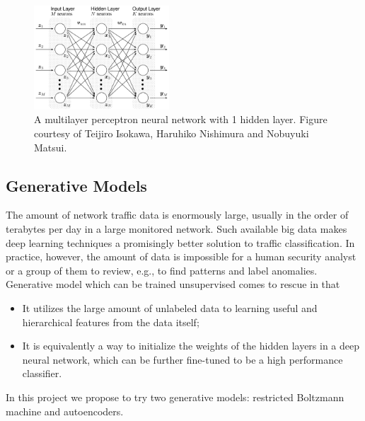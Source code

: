\begin{figure}[h]
    \centering
    \includegraphics[width=0.45\textwidth]{figures/multilayer_perceptron.png}
    \caption{A multilayer perceptron neural network with 1 hidden layer.
        Figure courtesy of Teijiro Isokawa, Haruhiko Nishimura and Nobuyuki Matsui.}
    \label{Fig:MLPArchitecture}
\end{figure}

\subsection{Generative Models}
The amount of network traffic data is enormously large, usually in the order of terabytes
per day in a large monitored network.
Such available big data makes deep learning techniques a promisingly better solution
to traffic classification.
In practice, however, the amount of data is impossible for a human security analyst or
a group of them to review, e.g., to find patterns and label anomalies.
Generative model which can be trained unsupervised comes to rescue in that
\begin{itemize}
    \item It utilizes the large amount of unlabeled data to learning useful and hierarchical features
        from the data itself;
    \item It is equivalently a way to initialize the weights of the hidden layers
        in a deep neural network, which can be further fine-tuned to be a high performance classifier.
\end{itemize}
In this project we propose to try two generative models: restricted Boltzmann machine and autoencoders.

